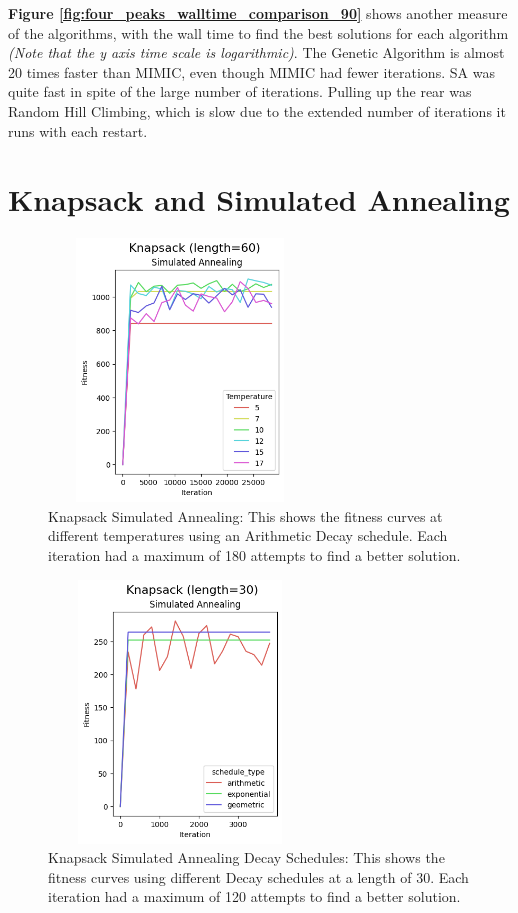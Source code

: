 \documentclass[letterpaper]{article} %
\begin{document}
\textbf{Figure \ref{fig:four_peaks_walltime_comparison_90}} shows another measure of the algorithms, with the wall time to find the best solutions for each algorithm \emph{(Note that the y axis time scale is logarithmic)}. The Genetic Algorithm is almost 20 times faster than MIMIC, even though MIMIC had fewer iterations.  SA was quite fast in spite of the large number of iterations.  Pulling up the rear was Random Hill Climbing, which is slow due to the extended number of iterations it runs with each restart.

\section{Knapsack and Simulated Annealing}
\begin{figure}[!htb]
\centering
\includegraphics[width=2.75in, height=2.75in]{figures/Knapsack_length=60_Simulated_Annealing_l_60_ma_180_d_arith_t_5__7__10__12__15__17_.png}
\caption{Knapsack Simulated Annealing: This shows the fitness curves at different temperatures using an Arithmetic Decay schedule. Each iteration had a maximum of 180 attempts to find a better solution. }
\label{fig:knapsack_sa}
\end{figure}

\begin{figure}[!htb]
\centering
\includegraphics[width=2.75in, height=2.75in]{figures/Knapsack_length=30_Simulated_Annealing_l_30_ma_120_d_geom__arith__exp_t_10_.png}
\caption{Knapsack Simulated Annealing Decay Schedules: This shows the fitness curves using different Decay schedules at a length of 30. Each iteration had a maximum of 120 attempts to find a better solution. }
\label{fig:knapsack_sa_decay}
\end{figure}
\end{document}
